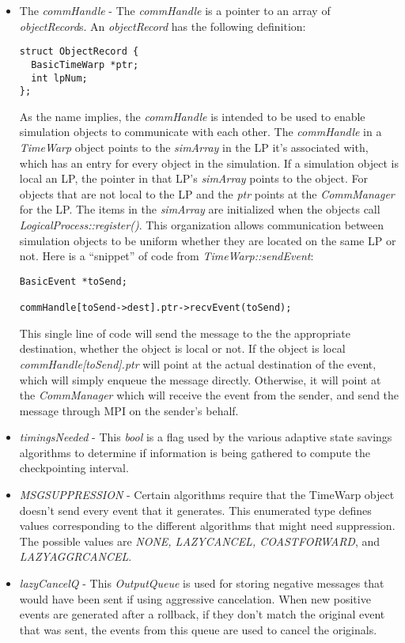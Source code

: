 \documentclass[11pt]{report}
\begin{document}
\begin{itemize}
\item
The {\it commHandle} - The {\it commHandle} is a pointer to an array of
{\it objectRecord}s. An {\it objectRecord} has the following definition: 

\begin{verbatim}
struct ObjectRecord {
  BasicTimeWarp *ptr;
  int lpNum;
};
\end{verbatim}

As the name implies, the {\it commHandle} is intended to be used to enable
simulation objects to communicate with each other.  The {\it commHandle}
in a {\it TimeWarp} object points to the {\it simArray} in the LP it's
associated with, which has an entry for every object in the simulation.
If a simulation object is local an LP, the pointer in that LP's {\it
simArray} points to the object.  For objects that are not local to the LP
and the {\it ptr} points at the {\it CommManager} for the LP.  The items
in the {\it simArray} are initialized when the objects call {\it
LogicalProcess::register()}. This organization allows communication
between simulation objects to be uniform whether they are located on the
same LP or not.  Here is a ``snippet'' of code from {\it
TimeWarp::sendEvent}:

\begin{verbatim}
BasicEvent *toSend;

commHandle[toSend->dest].ptr->recvEvent(toSend);    
\end{verbatim}

This single line of code will send the message to the the appropriate
destination, whether the object is local or not.  If the object is local
{\it commHandle[toSend].ptr} will point at the actual destination of the
event, which will simply enqueue the message directly.  Otherwise, it will
point at the {\it CommManager} which will receive the event from the
sender, and send the message through MPI on the sender's behalf.

\item
{\it timingsNeeded} - This {\it bool} is a flag used by the various
adaptive state savings algorithms to determine if information is being
gathered to compute the checkpointing interval.

\item
{\it MSGSUPPRESSION} - Certain algorithms require that the TimeWarp object
doesn't send every event that it generates.  This enumerated type defines
values corresponding to the different algorithms that might need
suppression.  The possible values are {\it NONE, LAZYCANCEL,
COASTFORWARD}, and {\it LAZYAGGRCANCEL}.

\item
{\it lazyCancelQ} - This {\it OutputQueue} is used for storing negative
messages that would have been sent if using aggressive cancelation.  When
new positive events are generated after a rollback, if they don't match
the original event that was sent, the events from this queue are used to
cancel the originals.
\end{itemize} 
\end{document}
